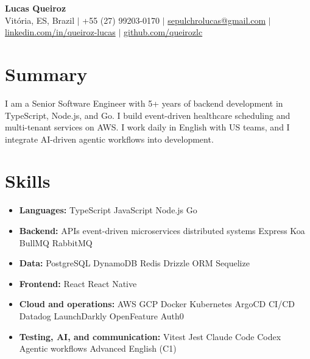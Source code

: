\documentclass[letterpaper,10pt]{article}
\newcommand{\resumeItem}[1]{\item\small{#1}}
\newcommand{\resumeSubHeadingList}{\begin{itemize}[leftmargin=0.15in, label={}, nosep]}
\newcommand{\resumeSubHeadingListEnd}{\end{itemize}}
\begin{document}
\begin{center}
  \textbf{\Huge Lucas Queiroz} \\[3pt]
  \small Vit\'oria, ES, Brazil $|$ +55 (27) 99203-0170 $|$ \href{mailto:sepulchrolucas@gmail.com}{sepulchrolucas@gmail.com} $|$
  \href{https://linkedin.com/in/queiroz-lucas}{linkedin.com/in/queiroz-lucas} $|$
  \href{https://github.com/queirozlc}{github.com/queirozlc}
\end{center}
\vspace{2pt}

\section{Summary}
I am a Senior Software Engineer with 5+ years of backend development in TypeScript, Node.js, and Go. I build event-driven healthcare scheduling and multi-tenant services on AWS. I work daily in English with US teams, and I integrate AI-driven agentic workflows into development.

\section{Skills}
\resumeSubHeadingList
\resumeItem{\textbf{Languages:} TypeScript \textbar{} JavaScript \textbar{} Node.js \textbar{} Go}
\resumeItem{\textbf{Backend:} APIs \textbar{} event-driven \textbar{} microservices \textbar{} distributed systems \textbar{} Express \textbar{} Koa \textbar{} BullMQ \textbar{} RabbitMQ}
\resumeItem{\textbf{Data:} PostgreSQL \textbar{} DynamoDB \textbar{} Redis \textbar{} Drizzle ORM \textbar{} Sequelize}
\resumeItem{\textbf{Frontend:} React \textbar{} React Native}
\resumeItem{\textbf{Cloud and operations:} AWS \textbar{} GCP \textbar{} Docker \textbar{} Kubernetes \textbar{} ArgoCD \textbar{} CI/CD \textbar{} Datadog \textbar{} LaunchDarkly \textbar{} OpenFeature \textbar{} Auth0}
\resumeItem{\textbf{Testing, AI, and communication:} Vitest \textbar{} Jest \textbar{} Claude Code \textbar{} Codex \textbar{} Agentic workflows \textbar{} Advanced English (C1)}
\resumeSubHeadingListEnd
\end{document}
